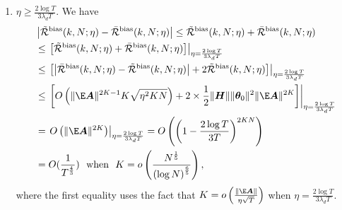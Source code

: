 \begin{enumerate}[leftmargin=*]
\begin{enumerate}[leftmargin=*]
\begin{align*}
            &\leq \frac{1}{2}\|\mH\|\|\vtheta_0\|^2\|\E\mA\|^{2K}\left(\left((\frac{\sqrt{2\deltaA\eta^2NK}}{\|\E\mA\|}+1)^K-1\right)^2+2\left((\frac{\sqrt{2\deltaA\eta^2NK}}{\|\E\mA\|}+1)^K-1\right)\right) \\
            &\leq \frac{1}{2}\|\mH\|\|\vtheta_0\|^2\|\E\mA\|^{2K}\left(\frac{8K^2\deltaA\eta^2NK}{\|\E\mA\|^2}+4K\frac{\sqrt{2\deltaA\eta^2NK}}{\|\E\mA\|}\right) \\
            &=O\left(\|\E\mA\|^{2K-1}K\sqrt{\eta^2NK}\right),
        \end{align*}
        where the second inequality is by .
        \item $\eta \geq \frac{2\log T}{3\lambda_dT}$. 
        We have
        \begin{align*}
            &\left|\Tilde{\cR}^{\bias}(k, N;\eta) -\bar{\cR}^{\bias}(k,N;\eta)\right|\leq\Tilde{\cR}^{\bias}(k, N;\eta) +\bar{\cR}^{\bias}(k, N;\eta) \\
            &\leq\left.\left[\Tilde{\cR}^{\bias}(k, N;\eta) +\bar{\cR}^{\bias}(k, N;\eta)\right] \right|_{\eta=\frac{2\log T}{3\lambda_dT}} \\
            &\leq\left.\left[\left|\bar{\cR}^{\bias}(k, N;\eta) - \Tilde{\cR}^{\bias}(k, N;\eta) \right|+2\Tilde{\cR}^{\bias}(k, N;\eta)  \right]\right|_{\eta=\frac{2\log T}{3\lambda_dT}} \\
            &\leq \left.\left[O\left(\|\E\mA\|^{2K-1}K\sqrt{\eta^2KN}\right)+2\times \frac{1}{2}\|\mH\|\|\vtheta_0\|^2\|\E\mA\|^{2K}\right]\right|_{\eta=\frac{2\log T}{3\lambda_dT}} \\
            &=\left.O\left(\|\E\mA\|^{2K}\right)\right|_{\eta=\frac{2\log T}{3\lambda_dT}} = O\left(\left(1-\frac{2\log T}{3T}\right)^{2KN}\right) \\
            &=O(\frac{1}{T^{\frac{4}{3}}}) ~~\text{when} ~~K = o\left(\frac{N^{\frac{1}{5}}}{\left(\log N\right)^{\frac{6}{5}}}\right), \\    
        \end{align*}
        where the first equality uses the fact that $K=o\left(\frac{\|\E\mA\|}{\eta\sqrt{T}}\right)$ when $\eta = \frac{2\log T}{3\lambda_d T}$.
    \end{enumerate}
    

\end{enumerate}
